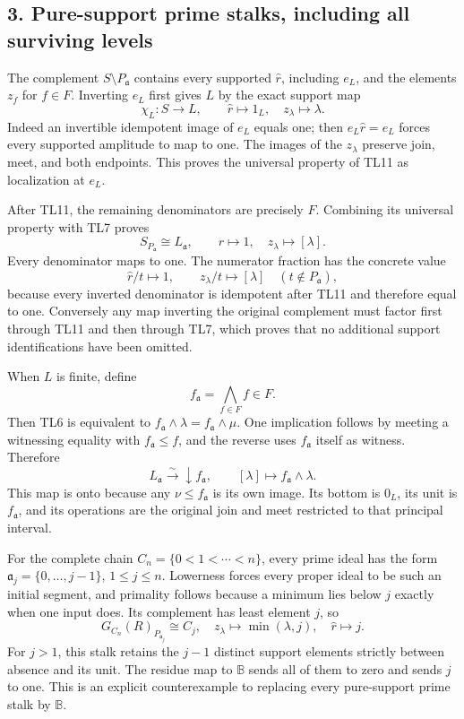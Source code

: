 \documentclass[11pt,a4paper]{article}
\theoremstyle{definition}\newtheorem{definition}[theorem]{Definition}
\begin{document}
\subsection{3. Pure-support prime stalks, including all surviving
levels}\label{pure-support-prime-stalks-including-all-surviving-levels}

The complement \(S\setminus P_{\mathfrak a}\) contains every supported
\(\widehat r\), including \(e_L\), and the elements \(z_f\) for
\(f\in F\). Inverting \(e_L\) first gives \(L\) by the exact support map
\[
 \chi_L:S\longrightarrow L,\qquad
 \widehat r\mapsto1_L,\quad z_\lambda\mapsto\lambda.
 \tag{TL11}
\] Indeed an invertible idempotent image of \(e_L\) equals one; then
\(e_L\widehat r=e_L\) forces every supported amplitude to map to one.
The images of the \(z_\lambda\) preserve join, meet, and both endpoints.
This proves the universal property of TL11 as localization at \(e_L\).

After TL11, the remaining denominators are precisely \(F\). Combining
its universal property with TL7 proves \[
 \boxed{S_{P_{\mathfrak a}}\cong L_{\mathfrak a},\qquad
 \widehat r\mapsto1,\quad z_\lambda\mapsto[\lambda].}
 \tag{TL12}
\] Every denominator maps to one. The numerator fraction has the
concrete value \[
 \widehat r/t\longmapsto1,\qquad z_\lambda/t\longmapsto[\lambda]
 \quad(t\notin P_{\mathfrak a}),
\] because every inverted denominator is idempotent after TL11 and
therefore equal to one. Conversely any map inverting the original
complement must factor first through TL11 and then through TL7, which
proves that no additional support identifications have been omitted.

When \(L\) is finite, define \[
 f_{\mathfrak a}=\bigwedge_{f\in F}f\in F.
 \tag{TL13}
\] Then TL6 is equivalent to
\(f_{\mathfrak a}\wedge\lambda=f_{\mathfrak a}\wedge\mu\). One
implication follows by meeting a witnessing equality with
\(f_{\mathfrak a}\le f\), and the reverse uses \(f_{\mathfrak a}\)
itself as witness. Therefore \[
 \boxed{L_{\mathfrak a}\xrightarrow{\sim}\downarrow f_{\mathfrak a},\qquad
 [\lambda]\mapsto f_{\mathfrak a}\wedge\lambda.}
 \tag{TL14}
\] This map is onto because any \(\nu\le f_{\mathfrak a}\) is its own
image. Its bottom is \(0_L\), its unit is \(f_{\mathfrak a}\), and its
operations are the original join and meet restricted to that principal
interval.

For the complete chain \(C_n=\{0<1<\cdots<n\}\), every prime ideal has
the form \(\mathfrak a_j=\{0,\ldots,j-1\}\), \(1\le j\le n\). Lowerness
forces every proper ideal to be such an initial segment, and primality
follows because a minimum lies below \(j\) exactly when one input does.
Its complement has least element \(j\), so \[
 \boxed{G_{C_n}(R)_{P_{\mathfrak a_j}}\cong C_j,
 \quad z_\lambda\mapsto\min(\lambda,j),\quad\widehat r\mapsto j.}
 \tag{TL15}
\] For \(j>1\), this stalk retains the \(j-1\) distinct support elements
strictly between absence and its unit. The residue map to \(\mathbb B\)
sends all of them to zero and sends \(j\) to one. This is an explicit
counterexample to replacing every pure-support prime stalk by
\(\mathbb B\).
\end{document}
